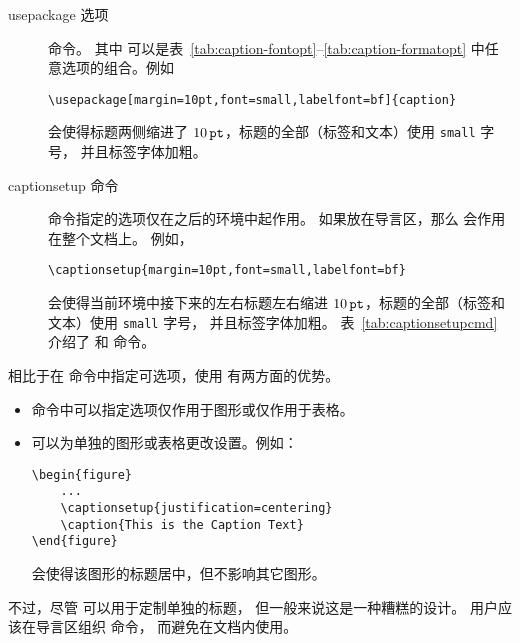 \begin{description}
	\item[usepackage 选项] 
	
	 命令。
	其中 \opt{[options]} 可以是表~\ref{tab:caption-fontopt}--\ref{tab:caption-formatopt} 中任意选项的组合。例如
\begin{lstlisting}
\usepackage[margin=10pt,font=small,labelfont=bf]{caption}
\end{lstlisting}
	会使得标题两侧缩进了 $10\,\mathtt{pt}$，标题的全部（标签和文本）使用 \texttt{small} 字号，
	并且标签字体加粗。
	
	\item[captionsetup 命令]
	
	 命令指定的选项仅在之后的环境中起作用。
	如果放在导言区，那么  会作用在整个文档上。
	例如，
\begin{lstlisting}
\captionsetup{margin=10pt,font=small,labelfont=bf}
\end{lstlisting}
	会使得当前环境中接下来的左右标题左右缩进 $10\,\mathtt{pt}$，标题的全部（标签和文本）使用 \texttt{small} 字号，
	并且标签字体加粗。
	表~\ref{tab:captionsetupcmd} 介绍了  和  命令。
\end{description}

相比于在  命令中指定可选项，使用  有两方面的优势。
\begin{itemize}
	\item {} 命令中可以指定选项仅作用于图形或仅作用于表格。
	\item {} 可以为单独的图形或表格更改设置。例如：
\begin{lstlisting}
\begin{figure}
	...
	\captionsetup{justification=centering}
	\caption{This is the Caption Text}
\end{figure}
\end{lstlisting}
	会使得该图形的标题居中，但不影响其它图形。
\end{itemize}
不过，尽管  可以用于定制单独的标题，
但一般来说这是一种糟糕的设计。
用户应该在导言区组织  命令，
而避免在文档内使用。


